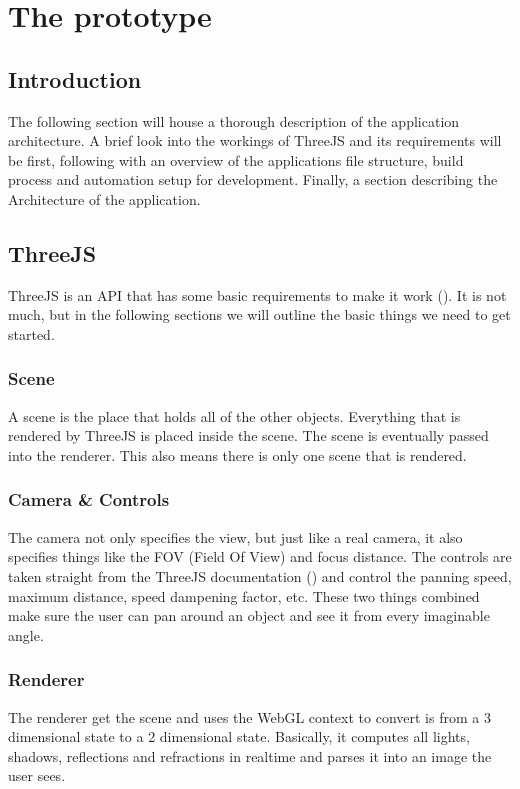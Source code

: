\section{The prototype}
\subsection{Introduction}
The following section will house a thorough description of the application architecture. A brief look into the workings of ThreeJS and its requirements will be first, following with an overview of the applications file structure, build process and automation setup for development. Finally, a section describing the Architecture of the application.

\subsection{ThreeJS}
ThreeJS is an API that has some basic requirements to make it work (\cite{ThreeJSgettingStarted}). It is not much, but in the following sections we will outline the basic things we need to get started.
\subsubsection{Scene}
A scene is the place that holds all of the other objects. Everything that is rendered by ThreeJS is placed inside the scene. The scene is eventually passed into the renderer. This also means there is only one scene that is rendered.
\subsubsection{Camera \& Controls}
The camera not only specifies the view, but just like a real camera, it also specifies things like the FOV (Field Of View) and focus distance. The controls are taken straight from the ThreeJS documentation (\cite{ThreeJSgettingStarted}) and control the panning speed, maximum distance, speed dampening factor, etc. These two things combined make sure the user can pan around an object and see it from every imaginable angle.
\subsubsection{Renderer}
The renderer get the scene and uses the WebGL context to convert is from a 3 dimensional state to a 2 dimensional state. Basically, it computes all lights, shadows, reflections and refractions in realtime and parses it into an image the user sees.
